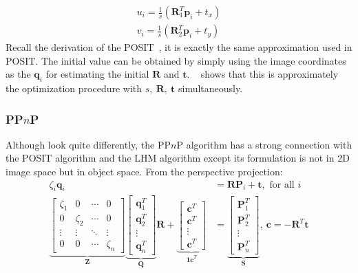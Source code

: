 \documentclass[a4paper]{report}
\begin{document}
\begin{align*}
u_i = \frac{1}{s}(\mathbf{R}_1^T\mathbf{p}_i+t_x) \\
v_i = \frac{1}{s}(\mathbf{R}_2^T\mathbf{p}_i+t_y)
\end{align*}
Recall the derivation of the POSIT~\cite{oberkampf1996iterative}, it is exactly the same approximation used in POSIT. The initial value can be obtained by simply using the image coordinates as the $\mathbf{q}_i$ for estimating the initial $\mathbf{R}$ and $\mathbf{t}$. ~\cite{lu2000fast} shows that this is approximately the optimization procedure with $s,\ \mathbf{R},\ \mathbf{t}$ simultaneously.

\subsubsection{PP$n$P}
Although look quite differently, the PP$n$P algorithm has a strong connection with the POSIT algorithm and the LHM algorithm except its formulation is not in $2$D image space but in object space. From the perspective projection:
\begin{align*}
\zeta_i \mathbf{q}_i &= \mathbf{R}\mathbf{P}_i+\mathbf{t},\text{ for all $i$} \\
\underbrace{
\left[
\begin{matrix}
\zeta_1 & 0 & \cdots & 0 \\
0 & \zeta_2 & \cdots & 0 \\
\vdots & \vdots & \ddots & \vdots \\
0 & 0 & \cdots & \zeta_n
\end{matrix}
\right]}_{\mathbf{Z}}
\underbrace{\left[
\begin{matrix}
\mathbf{q}_1^T \\
\mathbf{q}_2^T \\
\vdots \\
\mathbf{q}_n^T
\end{matrix}
\right]}_{\mathbf{Q}}\mathbf{R}+
\underbrace{\left[
\begin{matrix}
\mathbf{c}^T \\
\mathbf{c}^T \\
\vdots \\
\mathbf{c}^T
\end{matrix}
\right]}_{\mathbf{1c}^T}&=
\underbrace{\left[
\begin{matrix}
\mathbf{P}_1^T \\
\mathbf{P}_2^T \\
\vdots \\
\mathbf{P}_n^T
\end{matrix}
\right]}_{\mathbf{S}},\ \mathbf{c}=-\mathbf{R}^T\mathbf{t}
\end{align*}
\end{document}
